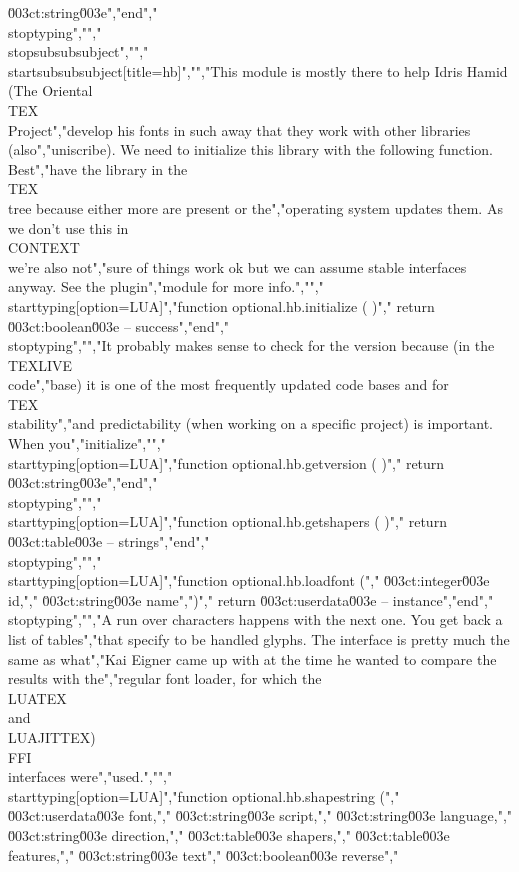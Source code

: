 \u003ct:string\u003e","end","\\stoptyping","","\\stopsubsubsubject","","\\startsubsubsubject[title=hb]","","This module is mostly there to help Idris Hamid (The Oriental \\TEX\\ Project","develop his fonts in such away that they work with other libraries (also","uniscribe). We need to initialize this library with the following function. Best","have the library in the \\TEX\\ tree because either more are present or the","operating system updates them. As we don't use this in \\CONTEXT\\ we're also not","sure of things work ok but we can assume stable interfaces anyway. See the plugin","module for more info.","","\\starttyping[option=LUA]","function optional.hb.initialize ( )","    return \u003ct:boolean\u003e -- success","end","\\stoptyping","","It probably makes sense to check for the version because (in the \\TEXLIVE\\ code","base) it is one of the most frequently updated code bases and for \\TEX\\ stability","and predictability (when working on a specific project) is important. When you","initialize","","\\starttyping[option=LUA]","function optional.hb.getversion ( )","    return \u003ct:string\u003e","end","\\stoptyping","","\\starttyping[option=LUA]","function optional.hb.getshapers ( )","    return \u003ct:table\u003e -- strings","end","\\stoptyping","","\\starttyping[option=LUA]","function optional.hb.loadfont (","    \u003ct:integer\u003e id,","    \u003ct:string\u003e  name",")","    return \u003ct:userdata\u003e -- instance","end","\\stoptyping","","A run over characters happens with the next one. You get back a list of tables","that specify to be handled glyphs. The interface is pretty much the same as what","Kai Eigner came up with at the time he wanted to compare the results with the","regular font loader, for which the \\LUATEX\\ and \\LUAJITTEX) \\FFI\\ interfaces were","used.","","\\starttyping[option=LUA]","function optional.hb.shapestring (","    \u003ct:userdata\u003e font,","    \u003ct:string\u003e   script,","    \u003ct:string\u003e   language,","    \u003ct:string\u003e   direction,","    \u003ct:table\u003e    shapers,","    \u003ct:table\u003e    features,","    \u003ct:string\u003e   text","    \u003ct:boolean\u003e  reverse","    